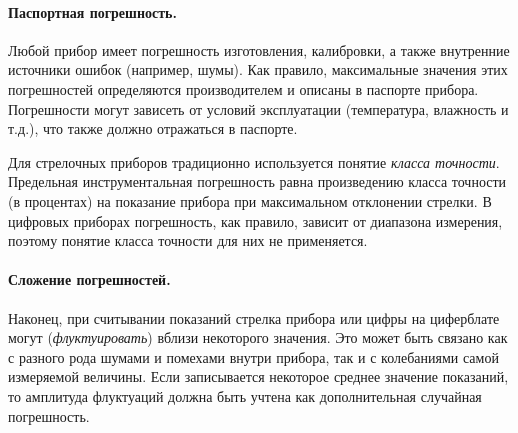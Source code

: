 
\paragraph{Паспортная погрешность.}
Любой прибор имеет погрешность изготовления, калибровки, а также внутренние
источники ошибок (например, шумы). Как правило, максимальные значения
этих погрешностей определяются производителем и описаны в паспорте
прибора. Погрешности могут зависеть от условий эксплуатации (температура,
влажность и т.д.), что также должно отражаться в паспорте.


Для стрелочных приборов традиционно используется понятие \emph{класса
точности}. Предельная инструментальная погрешность равна произведению
класса точности (в процентах) на показание прибора при максимальном
отклонении стрелки. В цифровых приборах погрешность, как правило,
зависит от диапазона измерения, поэтому понятие класса точности для
них не применяется.


\paragraph{Сложение погрешностей.}
Наконец, при считывании показаний стрелка прибора или цифры на циферблате
могут  (\emph{флуктуировать}) вблизи некоторого значения.
Это может быть связано как с разного рода шумами и помехами внутри прибора,
так и с колебаниями самой измеряемой величины. Если записывается некоторое
среднее значение показаний, то амплитуда флуктуаций должна быть учтена как
дополнительная случайная погрешность.

